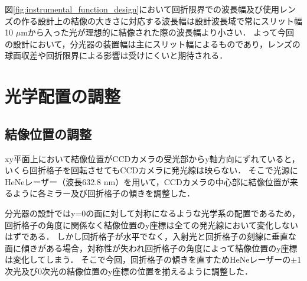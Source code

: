図\ref{fig:instrumental_function_design}において回折限界での波長幅及び使用レンズの作る設計上の結像の大きさに対応する波長幅は設計波長域で常にスリット幅10 $\mu$mから入った光が理想的に結像された際の波長幅より小さい．
よって今回の設計において，分光器の装置幅は主にスリット幅によるものであり，レンズの球面収差や回折限界による影響は受けにくいと期待される．





\section{光学配置の調整}



\subsection{結像位置の調整}
xy平面上において結像位置がCCDカメラの受光部からy軸方向にずれていると，いくら回折格子を回転させてもCCDカメラに発光線は映らない．
そこで光源にHeNeレーザー（波長632.8 nm）を用いて，CCDカメラの中心部に結像位置が来るように各ミラー及び回折格子の傾きを調整した．

分光器の設計ではy=0の面に対して対称になるような光学系の配置であるため，回折格子の角度に関係なく結像位置のy座標は全ての発光線において変化しないはずである．
しかし回折格子が水平でなく，入射光と回折格子の刻線に垂直な面に傾きがある場合，対称性が失われ回折格子の角度によって結像位置のy座標は変化してしまう．
そこで今回，回折格子の傾きを直すためHeNeレーザーの$\pm{}$1次光及び0次光の結像位置のy座標の位置を揃えるように調整した．




